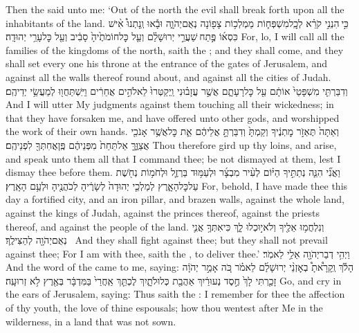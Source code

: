 {Then the \lord\space said unto me: ‘Out of the north the evil shall break forth upon all the inhabitants of the land.}
{כִּ֣י \legarmeh  הִנְנִ֣י קֹרֵ֗א לְכׇֽל\maqqaf מִשְׁפְּח֛וֹת מַמְלְכ֥וֹת צָפ֖וֹנָה נְאֻם\maqqaf יְהֹוָ֑ה וּבָ֡אוּ וְֽנָתְנוּ֩ אִ֨ישׁ כִּסְא֜וֹ פֶּ֣תַח \legarmeh  שַׁעֲרֵ֣י יְרוּשָׁלַ֗͏ִם וְעַ֤ל כׇּל\maqqaf חוֹמֹתֶ֙יהָ֙ סָבִ֔יב וְעַ֖ל כׇּל\maqqaf עָרֵ֥י יְהוּדָֽה׃}
{For, lo, I will call all the families of the kingdoms of the north, saith the \lord; and they shall come, and they shall set every one his throne at the entrance of the gates of Jerusalem, and against all the walls thereof round about, and against all the cities of Judah.}
{וְדִבַּרְתִּ֤י מִשְׁפָּטַי֙ אוֹתָ֔ם עַ֖ל כׇּל\maqqaf רָעָתָ֑ם אֲשֶׁ֣ר עֲזָב֗וּנִי וַֽיְקַטְּרוּ֙ לֵאלֹהִ֣ים אֲחֵרִ֔ים וַיִּֽשְׁתַּחֲו֖וּ לְמַעֲשֵׂ֥י יְדֵיהֶֽם׃}
{And I will utter My judgments against them touching all their wickedness; in that they have forsaken me, and have offered unto other gods, and worshipped the work of their own hands.}
{וְאַתָּה֙ תֶּאְזֹ֣ר מׇתְנֶ֔יךָ וְקַמְתָּ֙ וְדִבַּרְתָּ֣ אֲלֵיהֶ֔ם אֵ֛ת כׇּל\maqqaf אֲשֶׁ֥ר אָנֹכִ֖י אֲצַוֶּ֑ךָּ אַל\maqqaf תֵּחַת֙ מִפְּנֵיהֶ֔ם פֶּֽן\maqqaf אֲחִתְּךָ֖ לִפְנֵיהֶֽם׃}
{Thou therefore gird up thy loins, and arise, and speak unto them all that I command thee; be not dismayed at them, lest I dismay thee before them.}
{וַאֲנִ֞י הִנֵּ֧ה נְתַתִּ֣יךָ הַיּ֗וֹם לְעִ֨יר מִבְצָ֜ר וּלְעַמּ֥וּד בַּרְזֶ֛ל וּלְחֹמ֥וֹת נְחֹ֖שֶׁת עַל\maqqaf כׇּל\maqqaf הָאָ֑רֶץ לְמַלְכֵ֤י יְהוּדָה֙ לְשָׂרֶ֔יהָ לְכֹהֲנֶ֖יהָ וּלְעַ֥ם הָאָֽרֶץ׃}
{For, behold, I have made thee this day a fortified city, and an iron pillar, and brazen walls, against the whole land, against the kings of Judah, against the princes thereof, against the priests thereof, and against the people of the land.}
{וְנִלְחֲמ֥וּ אֵלֶ֖יךָ וְלֹא\maqqaf י֣וּכְלוּ לָ֑ךְ כִּי\maqqaf אִתְּךָ֥ אֲנִ֛י נְאֻם\maqqaf יְהֹוָ֖ה לְהַצִּילֶֽךָ׃ \petucha }
{And they shall fight against thee; but they shall not prevail against thee; For I am with thee, saith the \lord, to deliver thee.’}
\newperek
{}
{וַיְהִ֥י דְבַר\maqqaf יְהֹוָ֖ה אֵלַ֥י לֵאמֹֽר׃}
{And the word of the \lord\space came to me, saying:}
{הָלֹ֡ךְ וְֽקָרָ֩אתָ֩ בְאׇזְנֵ֨י יְרוּשָׁלַ֜͏ִם לֵאמֹ֗ר כֹּ֚ה אָמַ֣ר יְהֹוָ֔ה זָכַ֤רְתִּי לָךְ֙ חֶ֣סֶד נְעוּרַ֔יִךְ אַהֲבַ֖ת כְּלוּלֹתָ֑יִךְ לֶכְתֵּ֤ךְ אַֽחֲרַי֙ בַּמִּדְבָּ֔ר בְּאֶ֖רֶץ לֹ֥א זְרוּעָֽה׃}
{Go, and cry in the ears of Jerusalem, saying: Thus saith the \lord: I remember for thee the affection of thy youth, the love of thine espousals; how thou wentest after Me in the wilderness, in a land that was not sown.}
